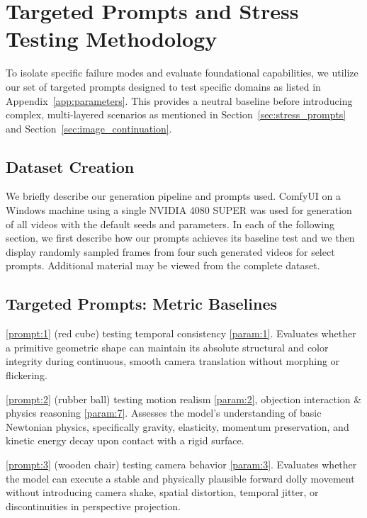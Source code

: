 \documentclass[sigconf]{acmart}
\begin{document}
\section{Targeted Prompts and Stress Testing Methodology}
\label{sec:targeted_and_stress_testing}
To isolate specific failure modes and evaluate foundational capabilities, we utilize our set of targeted prompts designed to test specific domains as listed in Appendix~\ref{app:parameters}.
This provides a neutral baseline before introducing complex, multi-layered scenarios as mentioned in Section~\ref{sec:stress_prompts} and Section~\ref{sec:image_continuation}.

\subsection{Dataset Creation}

We briefly describe our generation pipeline and prompts used. ComfyUI on a Windows machine using a single NVIDIA 4080 SUPER was used for generation of all videos with the default seeds and parameters. In each of the following section, we first describe how our prompts achieves its baseline test and we then display randomly sampled frames from four such generated videos for select prompts. Additional material may be viewed from the complete dataset.


\subsection{Targeted Prompts: Metric Baselines}



\ref{prompt:1} (red cube) testing temporal consistency \ref{param:1}. Evaluates whether a primitive geometric shape can maintain its absolute structural and color integrity during continuous, smooth camera translation without morphing or flickering.



\ref{prompt:2} (rubber ball) testing motion realism \ref{param:2}, objection interaction \& physics reasoning \ref{param:7}. Assesses the model's understanding of basic Newtonian physics, specifically gravity, elasticity, momentum preservation, and kinetic energy decay upon contact with a rigid surface.



\ref{prompt:3} (wooden chair) testing camera behavior \ref{param:3}. Evaluates whether the model can execute a stable and physically plausible forward dolly movement without introducing camera shake, spatial distortion, temporal jitter, or discontinuities in perspective projection.
\end{document}

